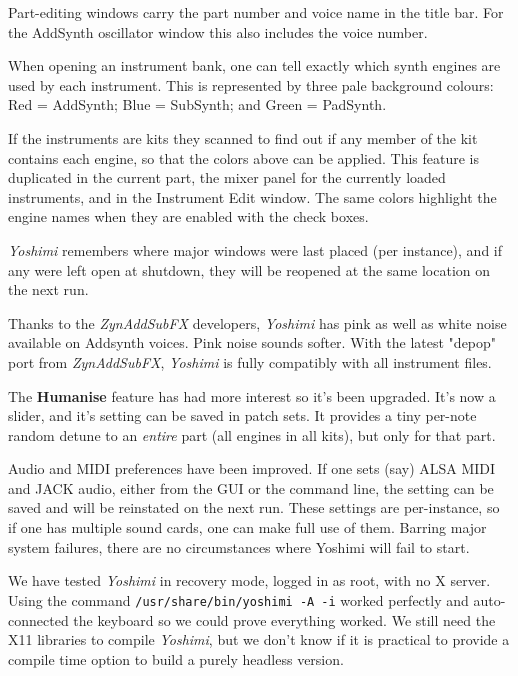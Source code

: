 \documentclass[
 11pt,
 twoside,
 a4paper,
 final                                 %
]{article}
\begin{document}
   Part-editing windows carry the part number and voice name in the title bar.
   For the AddSynth oscillator window this also includes the voice number.

   When opening an instrument bank, one can tell exactly which synth
   engines are used by each instrument. This is represented by three pale
   background colours: Red = AddSynth; Blue = SubSynth; and Green = PadSynth.

   If the instruments are kits they scanned to find out if any member of the
   kit contains each engine, so that the colors above can be applied.
   This feature is duplicated in the current part, the mixer panel for the
   currently loaded instruments, and in the Instrument Edit window.
   The same colors highlight the engine names when they are enabled with the
   check boxes. 

   \textsl{Yoshimi} remembers where major windows were last placed (per
   instance), and if any were left open at shutdown, they will be reopened at
   the same location on the next run.

   Thanks to the \textsl{ZynAddSubFX} developers, \textsl{Yoshimi} has pink
   as well as white noise available on Addsynth voices. Pink noise sounds
   softer.  With the latest "depop" port from \textsl{ZynAddSubFX},
   \textsl{Yoshimi} is fully compatibly with all instrument files.

   The \textbf{Humanise} feature has had more interest so it's been upgraded.
   It's now a slider, and it's setting can be saved in patch sets. It provides
   a tiny per-note random detune to an \textsl{entire} part (all engines in all
   kits), but only for that part.

   Audio and MIDI preferences have been improved. If one sets (say) ALSA MIDI
   and JACK audio, either from the GUI or the command line, the setting can be
   saved and will be reinstated on the next run. These settings are
   per-instance, so if one has multiple sound cards, one can make full use of
   them.  Barring major system failures, there are no circumstances where
   Yoshimi will fail to start.

   We have tested \textsl{Yoshimi} in recovery mode, logged in as root, with
   no X server. Using the command \texttt{/usr/share/bin/yoshimi -A -i}
   worked perfectly and auto-connected the keyboard so we could prove
   everything worked.  We still need the X11 libraries to compile
   \textsl{Yoshimi}, but we don't know if it is practical to provide a compile
   time option to build a purely headless version.
\end{document}
